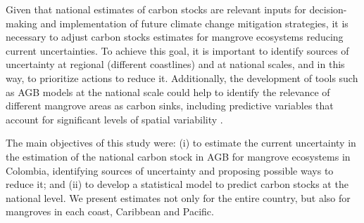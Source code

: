 \documentclass[review, authoryear]{elsarticle}   	%
\begin{document}

Given that national estimates of carbon stocks are relevant inputs for decision-making and implementation of future climate change mitigation strategies, it is necessary to adjust carbon stocks estimates for mangrove ecosystems reducing current uncertainties. To achieve this goal, it is important to identify sources of uncertainty at regional (different coastlines) and at national scales, and in this way, to prioritize actions to reduce it. Additionally, the development of tools such as AGB models at the national scale could help to identify the relevance of different mangrove areas as carbon sinks, including predictive variables that account for significant levels of spatial variability \citep{Ewel1998, Kristensen2008}. %

The main objectives of this study were: (i) to estimate the current uncertainty in the estimation of the national carbon stock in AGB for mangrove ecosystems in Colombia, identifying sources of uncertainty and proposing possible ways to reduce it; and (ii) to develop a statistical model to predict carbon stocks at the national level. We present estimates not only for the entire country, but also for mangroves in each coast, Caribbean and Pacific. 

\end{document}
